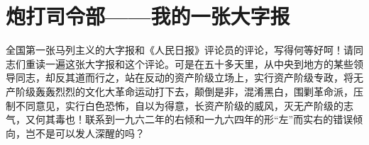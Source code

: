 \section[炮打司令部——我的一张大字报（一九六六年八月五日）]{炮打司令部——我的一张大字报}


全国第一张马列主义的大字报和《人民日报》评论员的评论，写得何等好呵！请同志们重读一遍这张大字报和这个评论。可是在五十多天里，从中央到地方的某些领导同志，却反其道而行之，站在反动的资产阶级立场上，实行资产阶级专政，将无产阶级轰轰烈烈的文化大革命运动打下去，颠倒是非，混淆黑白，围剿革命派，压制不同意见，实行白色恐怖，自以为得意，长资产阶级的威风，灭无产阶级的志气，又何其毒也！联系到一九六二年的右倾和一九六四年的形“左”而实右的错误倾向，岂不是可以发人深醒的吗？


